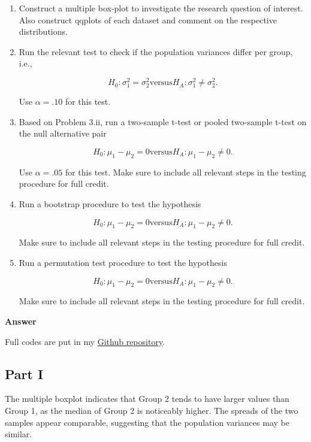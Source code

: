 \documentclass[letterpaper]{article}
\begin{document}
	\begin{enumerate}
		
		\item[i] Construct a multiple box-plot to investigate the research question of interest. Also construct qqplots of each dataset and comment on the respective distributions.
		
		\item[ii] Run the relevant test to check if the population variances differ per group, i.e.,
		
		\[
		H_0 : \sigma_1^2 = \sigma_2^2
		\text{versus} 
		H_A : \sigma_1^2 \ne \sigma_2^2.
		\]
		
		Use $\alpha = .10$ for this test.
		
		\item[iii] Based on Problem 3.ii, run a two-sample t-test or pooled two-sample t-test on the null alternative pair
		
		\[
		H_0 : \mu_1 - \mu_2 = 0
		\text{versus} 
		H_A : \mu_1 - \mu_2 \ne 0.
		\]
		
		Use $\alpha = .05$ for this test. Make sure to include all relevant steps in the testing procedure for full credit.
		
		\item[iv] Run a bootstrap procedure to test the hypothesis
		
		\[
		H_0 : \mu_1 - \mu_2 = 0
		\text{versus} 
		H_A : \mu_1 - \mu_2 \ne 0.
		\]
		
		Make sure to include all relevant steps in the testing procedure for full credit.
		
		\item[v] Run a permutation test procedure to test the hypothesis
		
		\[
		H_0 : \mu_1 - \mu_2 = 0
		\text{versus} 
		H_A : \mu_1 - \mu_2 \ne 0.
		\]
		
		Make sure to include all relevant steps in the testing procedure for full credit.
		
	\end{enumerate}
	
	\textbf{Answer}
	
	Full codes are put in my \href{https://github.com/zongyiliu/STAT_5291/tree/main/Homework/Homework_2}{Github repository}.
	
	\subsection{Part I}
	
	The multiple boxplot indicates that Group 2 tends to have larger
	values than Group 1, as the median of Group 2 is noticeably higher.
	The spreads of the two samples appear comparable, suggesting that
	the population variances may be similar.
	
\end{document}
